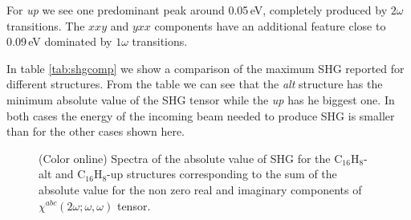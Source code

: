 \documentclass[pss]{wiley2sp} %
\begin{document}
For \emph{up} we see one predominant peak around 0.05\,eV, completely produced
by $2\omega$ transitions. The $xxy$ and $yxx$ components have an additional
feature close to 0.09\,eV dominated by $1\omega$ transitions.


In table \ref{tab:shgcomp} we show a comparison of the maximum SHG reported for different structures. From the table we can see that the \emph{alt} structure has the minimum absolute value of the SHG tensor while the \emph{up} has he biggest one. In both cases the energy of the incoming beam needed to produce SHG is smaller than for the other cases shown here.

\begin{figure}
\hfill
{}
\caption{(Color online) Spectra of the absolute value of SHG for the C$_{16}$H$_{8}$-alt 
    and C$_{16}$H$_{8}$-up structures corresponding to the sum of the absolute 
    value for the non zero real and imaginary components of $\chi^{abc}(2\omega;\omega,
    \omega) $ tensor.\label{fig:shg-abs-both}}
\end{figure}
\end{document}
